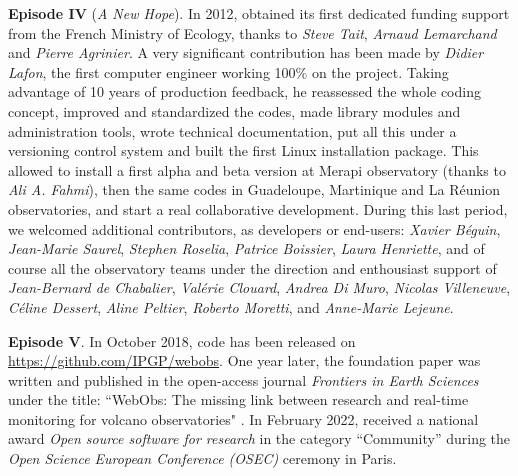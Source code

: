 \textbf{Episode IV} (\textit{A New Hope}). In 2012, \webobs obtained its first dedicated funding support from the French Ministry of Ecology, thanks to \textit{Steve Tait}, \textit{Arnaud Lemarchand} and \textit{Pierre Agrinier}. A very significant contribution has been made by \textit{Didier Lafon}, the first computer engineer working 100\% on the project. Taking advantage of 10 years of production feedback, he reassessed the whole coding concept, improved and standardized the codes, made library modules and administration tools, wrote technical documentation, put all this under a versioning control system and built the first Linux installation package. This allowed to install a first alpha and beta version at Merapi observatory (thanks to \textit{Ali A. Fahmi}), then the same codes in Guadeloupe, Martinique and La Réunion observatories, and start a real collaborative development. During this last period, we welcomed additional contributors, as developers or end-users: \textit{Xavier Béguin}, \textit{Jean-Marie Saurel}, \textit{Stephen Roselia}, \textit{Patrice Boissier}, \textit{Laura Henriette}, and of course all the observatory teams under the direction and enthousiast support of \textit{Jean-Bernard de Chabalier}, \textit{Valérie Clouard}, \textit{Andrea Di Muro}, \textit{Nicolas Villeneuve}, \textit{Céline Dessert}, \textit{Aline Peltier}, \textit{Roberto Moretti}, and \textit{Anne-Marie Lejeune}.

\textbf{Episode V}. In October 2018, \webobs code has been released on \url{https://github.com/IPGP/webobs}. One year later, the foundation paper was written and published in the open-access journal \textit{Frontiers in Earth Sciences} under the title: “WebObs: The missing link between research and real-time monitoring for volcano observatories" \citep{beauducel2020webobs}. In February 2022, \webobs received a national award {\it Open source software for research} in the category “Community” during the {\it Open Science European Conference (OSEC)} ceremony in Paris.
